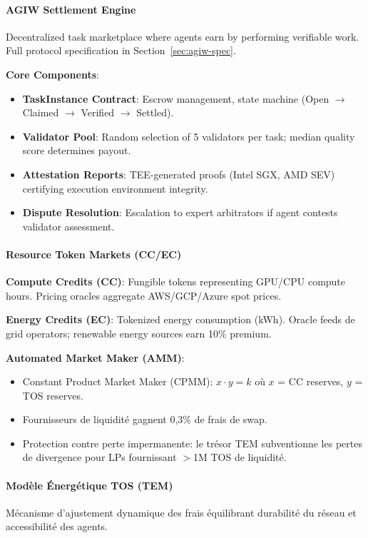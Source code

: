 \documentclass[11pt]{article}
\begin{document}
\paragraph{AGIW Settlement Engine}
Decentralized task marketplace where agents earn by performing verifiable work. Full protocol specification in Section~\ref{sec:agiw-spec}.

\textbf{Core Components}:
\begin{itemize}[noitemsep]
  \item \textbf{TaskInstance Contract}: Escrow management, state machine (Open $\to$ Claimed $\to$ Verified $\to$ Settled).
  \item \textbf{Validator Pool}: Random selection of 5 validators per task; median quality score determines payout.
  \item \textbf{Attestation Reports}: TEE-generated proofs (Intel SGX, AMD SEV) certifying execution environment integrity.
  \item \textbf{Dispute Resolution}: Escalation to expert arbitrators if agent contests validator assessment.
\end{itemize}

\paragraph{Resource Token Markets (CC/EC)}
\textbf{Compute Credits (CC)}: Fungible tokens representing GPU/CPU compute hours. Pricing oracles aggregate AWS/GCP/Azure spot prices.

\textbf{Energy Credits (EC)}: Tokenized energy consumption (kWh). Oracle feeds de grid operators; renewable energy sources earn 10\% premium.

\textbf{Automated Market Maker (AMM)}:
\begin{itemize}[noitemsep]
  \item Constant Product Market Maker (CPMM): $x \cdot y = k$ où $x$ = CC reserves, $y$ = TOS reserves.
  \item Fournisseurs de liquidité gagnent 0,3\% de frais de swap.
  \item Protection contre perte impermanente: le trésor TEM subventionne les pertes de divergence pour LPs fournissant $>$1M TOS de liquidité.
\end{itemize}

\paragraph{Modèle Énergétique TOS (TEM)}
Mécanisme d'ajustement dynamique des frais équilibrant durabilité du réseau et accessibilité des agents.
\end{document}
